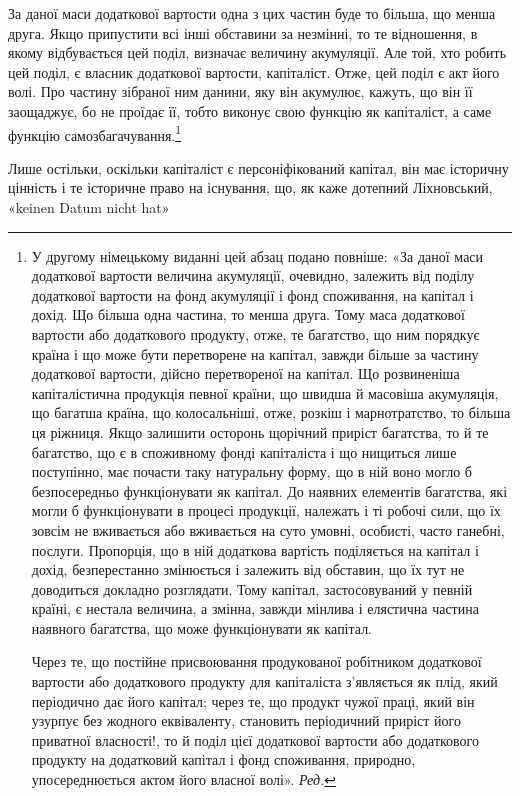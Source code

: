 За даної маси додаткової вартости одна з цих частин буде то
більша, що менша друга. Якщо припустити всі інші обставини
за незмінні, то те відношення, в якому відбувається цей поділ,
визначає величину акумуляції. Але той, хто робить цей поділ,
є власник додаткової вартости, капіталіст. Отже, цей поділ є
акт його волі. Про частину зібраної ним данини, яку він акумулює,
кажуть, що він її заощаджує, бо не проїдає її, тобто виконує
свою функцію як капіталіст, а саме функцію самозбагачування.\footnote*{
У другому німецькому виданні цей абзац подано повніше: «За
даної маси додаткової вартости величина акумуляції, очевидно, залежить
від поділу додаткової вартости на фонд акумуляції і фонд споживання,
на капітал і дохід. Що більша одна частина, то менша друга. Тому маса
додаткової вартости або додаткового продукту, отже, те багатство, що
ним порядкує країна і що може бути перетворене на капітал, завжди
більше за частину додаткової вартости, дійсно перетвореної на капітал.
Що розвиненіша капіталістична продукція певної країни, що швидша
й масовіша акумуляція, що багатша країна, що колосальніші, отже,
розкіш і марнотратство, то більша ця ріжниця. Якщо залишити осторонь
щорічний приріст багатства, то й те багатство, що є в споживному фонді
капіталіста і що нищиться лише поступінно, має почасти таку натуральну
форму, що в ній воно могло б безпосередньо функціонувати як капітал.
До наявних елементів багатства, які могли б функціонувати в процесі
продукції, належать і ті робочі сили, що їх зовсім не вживається або вживається
на суто умовні, особисті, часто ганебні, послуги. Пропорція, що
в ній додаткова вартість поділяється на капітал і дохід, безперестанно
змінюється і залежить від обставин, що їх тут не доводиться докладно
розглядати. Тому капітал, застосовуваний у певній країні, є нестала
величина, а змінна, завжди мінлива і елястична частина наявного багатства,
що може функціонувати як капітал.

Через те, що постійне присвоювання продукованої робітником додаткової
вартости або додаткового продукту для капіталіста з’являється
як плід, який періодично дає його капітал; через те, що продукт чужої
праці, який він узурпує без жодного еквіваленту, становить періодичний
приріст його приватної власності!, то й поділ цієї додаткової вартости або
додаткового продукту на додатковий капітал і фонд споживання, природно,
упосереднюється актом його власної волі». \emph{Ред.}
}

Лише остільки, оскільки капіталіст є персоніфікований капітал,
він має історичну цінність і те історичне право на існування,
що, як каже дотепний Ліхновський, «keinen Datum nicht hat»
\parbreak{}  %
